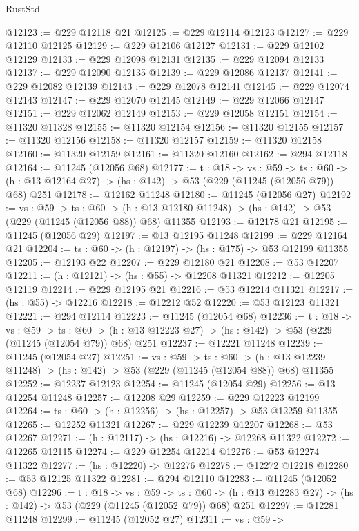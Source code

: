 \begin{lexlean}{RustStd}
\begin{coremodule}
@12123 := @229 @12118 @21
@12125 := @229 @12114 @12123
@12127 := @229 @12110 @12125
@12129 := @229 @12106 @12127
@12131 := @229 @12102 @12129
@12133 := @229 @12098 @12131
@12135 := @229 @12094 @12133
@12137 := @229 @12090 @12135
@12139 := @229 @12086 @12137
@12141 := @229 @12082 @12139
@12143 := @229 @12078 @12141
@12145 := @229 @12074 @12143
@12147 := @229 @12070 @12145
@12149 := @229 @12066 @12147
@12151 := @229 @12062 @12149
@12153 := @229 @12058 @12151
@12154 := @11320 @11328
@12155 := @11320 @12154
@12156 := @11320 @12155
@12157 := @11320 @12156
@12158 := @11320 @12157
@12159 := @11320 @12158
@12160 := @11320 @12159
@12161 := @11320 @12160
@12162 := @294 @12118
@12164 := @11245 (@12056 @68)
@12177 := {t : @18} ->
  {vs : @59} ->
  {ts : @60} -> (h : @13 @12164 @27) -> (hs : @142) -> @53 (@229 (@11245 (@12056 @79)) @68) @251
@12178 := @12162 @11248
@12180 := @11245 (@12056 @27)
@12192 := {vs : @59} ->
  {ts : @60} ->
  (h : @13 @12180 @11248) -> (hs : @142) -> @53 (@229 (@11245 (@12056 @88)) @68) @11355
@12193 := @12178 @21
@12195 := @11245 (@12056 @29)
@12197 := @13 @12195 @11248
@12199 := @229 @12164 @21
@12204 := {ts : @60} -> (h : @12197) -> (hs : @175) -> @53 @12199 @11355
@12205 := @12193 @22
@12207 := @229 @12180 @21
@12208 := @53 @12207
@12211 := (h : @12121) -> (hs : @55) -> @12208 @11321
@12212 := @12205 @12119
@12214 := @229 @12195 @21
@12216 := @53 @12214 @11321
@12217 := (hs : @55) -> @12216
@12218 := @12212 @52
@12220 := @53 @12123 @11321
@12221 := @294 @12114
@12223 := @11245 (@12054 @68)
@12236 := {t : @18} ->
  {vs : @59} ->
  {ts : @60} -> (h : @13 @12223 @27) -> (hs : @142) -> @53 (@229 (@11245 (@12054 @79)) @68) @251
@12237 := @12221 @11248
@12239 := @11245 (@12054 @27)
@12251 := {vs : @59} ->
  {ts : @60} ->
  (h : @13 @12239 @11248) -> (hs : @142) -> @53 (@229 (@11245 (@12054 @88)) @68) @11355
@12252 := @12237 @12123
@12254 := @11245 (@12054 @29)
@12256 := @13 @12254 @11248
@12257 := @12208 @29
@12259 := @229 @12223 @12199
@12264 := {ts : @60} -> (h : @12256) -> (hs : @12257) -> @53 @12259 @11355
@12265 := @12252 @11321
@12267 := @229 @12239 @12207
@12268 := @53 @12267
@12271 := (h : @12117) -> (hs : @12216) -> @12268 @11322
@12272 := @12265 @12115
@12274 := @229 @12254 @12214
@12276 := @53 @12274 @11322
@12277 := (hs : @12220) -> @12276
@12278 := @12272 @12218
@12280 := @53 @12125 @11322
@12281 := @294 @12110
@12283 := @11245 (@12052 @68)
@12296 := {t : @18} ->
  {vs : @59} ->
  {ts : @60} -> (h : @13 @12283 @27) -> (hs : @142) -> @53 (@229 (@11245 (@12052 @79)) @68) @251
@12297 := @12281 @11248
@12299 := @11245 (@12052 @27)
@12311 := {vs : @59} ->

\end{coremodule}
\end{lexlean}
